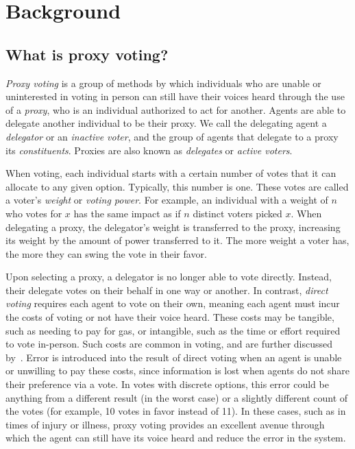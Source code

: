 \section{Background}\label{sec:\chptindicator-background}

\subsection{What is proxy voting?}\label{subsec:\chptindicator-what-is-proxy-voting?}
\textit{Proxy voting} is a group of methods by which individuals who are unable or
uninterested in voting in person can still have their voices heard through the use of
a \textit{proxy}, who is an individual authorized to act for another.
Agents are able to delegate another individual to be their proxy.
We call the delegating agent a \textit{delegator} or an \textit{inactive voter}, and
the group of agents that delegate to a proxy its \textit{constituents}.
Proxies are also known as \textit{delegates} or \textit{active voters}.

When voting, each individual starts with a certain number of votes that it can
allocate to any given option.
Typically, this number is one.
These votes are called a voter's \textit{weight} or \textit{voting power}.
For example, an individual with a weight of $n$ who votes for $x$ has the same impact
as if $n$ distinct voters picked $x$.
When delegating a proxy, the delegator's weight is transferred to the proxy,
increasing its weight by the amount of power transferred to it.
The more weight a voter has, the more they can swing the vote in their favor.

Upon selecting a proxy, a delegator is no longer able to vote directly.
Instead, their delegate votes on their behalf in one way or another.
In contrast, \textit{direct voting} requires each agent to vote on their own, meaning
each agent must incur the costs of voting or not have their voice heard.
These costs may be tangible, such as needing to pay for gas, or intangible, such as
the time or effort required to vote in-person.
Such costs are common in voting, and are further discussed by~\cite{Gershtein2019}.
Error is introduced into the result of direct voting when an agent is unable or
unwilling to pay these costs, since information is lost when agents do not share
their preference via a vote.
In votes with discrete options, this error could be anything from a different result
(in the worst case) or a slightly different count of the votes (for example, 10
votes in favor instead of 11).
In these cases, such as in times of injury or illness, proxy voting provides an
excellent avenue  through which the agent can still have its voice heard and reduce
the error in the system.

